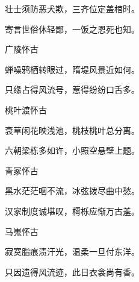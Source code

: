 \begin{poem}
    \begin{pl}壮士须防恶犬欺，三齐位定盖棺时。\end{pl}

    \begin{pl}寄言世俗休轻鄙，一饭之恩死也知。\end{pl}

    \emptypl

    \begin{pl}广陵怀古　\end{pl}

    \begin{pl}蝉噪鸦栖转眼过，隋堤风景近如何。\end{pl}

    \begin{pl}只缘占得风流号，惹得纷纷口舌多。\end{pl}

    \emptypl

    \begin{pl}桃叶渡怀古　\end{pl}

    \begin{pl}衰草闲花映浅池，桃枝桃叶总分离。\end{pl}

    \begin{pl}六朝梁栋多如许，小照空悬壁上题。\end{pl}

    \emptypl
    \begin{pl}青冢怀古　\end{pl}

    \begin{pl}黑水茫茫咽不流，冰弦拨尽曲中愁。\end{pl}

    \begin{pl}汉家制度诚堪叹，樗栎应惭万古羞。\end{pl}

    \emptypl

    \begin{pl}马嵬怀古　\end{pl}

    \begin{pl}寂寞脂痕渍汗光，温柔一旦付东洋。\end{pl}

    \begin{pl}只因遗得风流迹，此日衣衾尚有香。\end{pl}


\end{poem}
